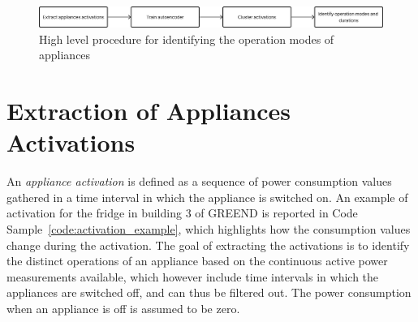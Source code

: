 \begin{figure}
  \centering
  \includegraphics[width=\linewidth]{images/modes_clustering/high_level_procedure.png}
  \caption{High level procedure for identifying the operation modes of appliances}
  \label{fig:high_level_procedure}
\end{figure}

\section{Extraction of Appliances Activations}

An \textit{appliance activation} is defined as a sequence of power consumption values gathered in a time interval in which the appliance is switched on. An example of activation for the fridge in building 3 of GREEND is reported in Code Sample~\ref{code:activation_example}, which highlights how the consumption values change during the activation. The goal of extracting the activations is to identify the distinct operations of an appliance based on the continuous active power measurements available, which however include time intervals in which the appliances are switched off, and can thus be filtered out. The power consumption when an appliance is off is assumed to be zero.




